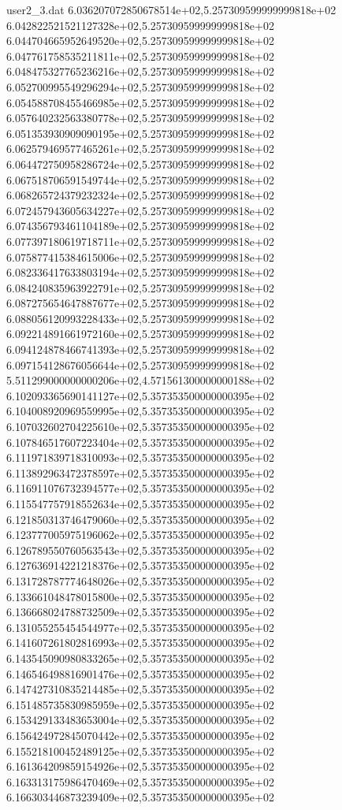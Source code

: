 \begin{filecontents}{user2_3.dat}
6.036207072850678514e+02,5.257309599999999818e+02
6.042822521521127328e+02,5.257309599999999818e+02
6.044704665952649520e+02,5.257309599999999818e+02
6.047761758535211811e+02,5.257309599999999818e+02
6.048475327765236216e+02,5.257309599999999818e+02
6.052700995549296294e+02,5.257309599999999818e+02
6.054588708455466985e+02,5.257309599999999818e+02
6.057640232563380778e+02,5.257309599999999818e+02
6.051353930909090195e+02,5.257309599999999818e+02
6.062579469577465261e+02,5.257309599999999818e+02
6.064472750958286724e+02,5.257309599999999818e+02
6.067518706591549744e+02,5.257309599999999818e+02
6.068265724379232324e+02,5.257309599999999818e+02
6.072457943605634227e+02,5.257309599999999818e+02
6.074356793461104189e+02,5.257309599999999818e+02
6.077397180619718711e+02,5.257309599999999818e+02
6.075877415384615006e+02,5.257309599999999818e+02
6.082336417633803194e+02,5.257309599999999818e+02
6.084240835963922791e+02,5.257309599999999818e+02
6.087275654647887677e+02,5.257309599999999818e+02
6.088056120993228433e+02,5.257309599999999818e+02
6.092214891661972160e+02,5.257309599999999818e+02
6.094124878466741393e+02,5.257309599999999818e+02
6.097154128676056644e+02,5.257309599999999818e+02
5.511299000000000206e+02,4.571561300000000188e+02
6.102093365690141127e+02,5.357353500000000395e+02
6.104008920969559995e+02,5.357353500000000395e+02
6.107032602704225610e+02,5.357353500000000395e+02
6.107846517607223404e+02,5.357353500000000395e+02
6.111971839718310093e+02,5.357353500000000395e+02
6.113892963472378597e+02,5.357353500000000395e+02
6.116911076732394577e+02,5.357353500000000395e+02
6.115547757918552634e+02,5.357353500000000395e+02
6.121850313746479060e+02,5.357353500000000395e+02
6.123777005975196062e+02,5.357353500000000395e+02
6.126789550760563543e+02,5.357353500000000395e+02
6.127636914221218376e+02,5.357353500000000395e+02
6.131728787774648026e+02,5.357353500000000395e+02
6.133661048478015800e+02,5.357353500000000395e+02
6.136668024788732509e+02,5.357353500000000395e+02
6.131055255454544977e+02,5.357353500000000395e+02
6.141607261802816993e+02,5.357353500000000395e+02
6.143545090980833265e+02,5.357353500000000395e+02
6.146546498816901476e+02,5.357353500000000395e+02
6.147427310835214485e+02,5.357353500000000395e+02
6.151485735830985959e+02,5.357353500000000395e+02
6.153429133483653004e+02,5.357353500000000395e+02
6.156424972845070442e+02,5.357353500000000395e+02
6.155218100452489125e+02,5.357353500000000395e+02
6.161364209859154926e+02,5.357353500000000395e+02
6.163313175986470469e+02,5.357353500000000395e+02
6.166303446873239409e+02,5.357353500000000395e+02

\end{filecontents}
